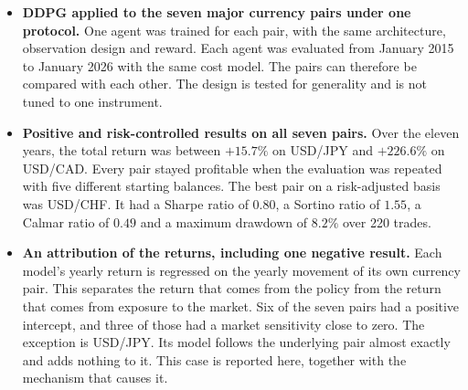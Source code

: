 \begin{itemize}
\item \textbf{DDPG applied to the seven major currency pairs under one protocol.} One agent was trained for each pair, with the same architecture, observation design and reward. Each agent was evaluated from January 2015 to January 2026 with the same cost model. The pairs can therefore be compared with each other. The design is tested for generality and is not tuned to one instrument.

\item \textbf{Positive and risk-controlled results on all seven pairs.} Over the eleven years, the total return was between $+15.7\%$ on USD/JPY and $+226.6\%$ on USD/CAD. Every pair stayed profitable when the evaluation was repeated with five different starting balances. The best pair on a risk-adjusted basis was USD/CHF. It had a Sharpe ratio \cite{sharpe_sharpe_1994} of $0.80$, a Sortino ratio \cite{sortino_performance_1994} of $1.55$, a Calmar ratio \cite{bacon_practical_2023} of $0.49$ and a maximum drawdown of $8.2\%$ over 220 trades.

\item \textbf{An attribution of the returns, including one negative result.} Each model's yearly return is regressed on the yearly movement of its own currency pair. This separates the return that comes from the policy from the return that comes from exposure to the market. Six of the seven pairs had a positive intercept, and three of those had a market sensitivity close to zero. The exception is USD/JPY. Its model follows the underlying pair almost exactly and adds nothing to it. This case is reported here, together with the mechanism that causes it.
\end{itemize}